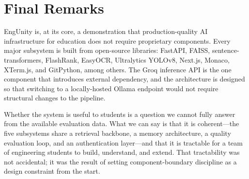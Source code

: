 \section{Final Remarks}
\label{sec:closing}

EngUnity is, at its core, a demonstration that production-quality AI infrastructure
for education does not require proprietary components. Every major subsystem is
built from open-source libraries: FastAPI, FAISS, sentence-transformers,
FlashRank, EasyOCR, Ultralytics YOLOv8, Next.js, Monaco, XTerm.js, and
GitPython, among others. The Groq inference API is the one component that
introduces external dependency, and the architecture is designed so that
switching to a locally-hosted Ollama endpoint would not require structural
changes to the pipeline.

Whether the system is useful to students is a question we cannot fully answer
from the available evaluation data. What we can say is that it is coherent---the
five subsystems share a retrieval backbone, a memory architecture, a quality
evaluation loop, and an authentication layer---and that it is tractable for a
team of engineering students to build, understand, and extend. That tractability
was not accidental; it was the result of setting component-boundary discipline
as a design constraint from the start.
